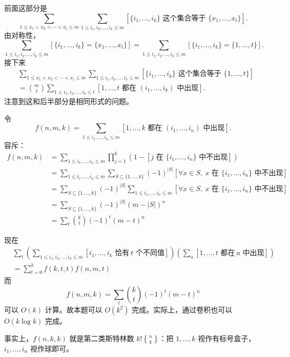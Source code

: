 \begin{frame}
    前面这部分是
    $$
    \sum_{1\le x_1<x_2<\cdots<x_t\le m}\sum_{1\le i_1,i_2,\ldots,i_k\le m}[\{i_1,\ldots,i_k\}\text{ 这个集合等于 }\{x_1,\ldots,x_t\}].
    $$
    由对称性，
    $$
    \sum_{1\le i_1,i_2,\ldots,i_k\le m}[\{i_1,\ldots,i_k\}=\{x_1,\ldots,x_t\}]=\sum_{1\le i_1,i_2,\ldots,i_k\le m}[\{i_1,\ldots,i_k\}=\{1,\ldots,t\}].
    $$
    接下来
    $$
    \begin{aligned}
    &\sum_{1\le x_1<x_2<\cdots<x_t\le m}\sum_{1\le i_1,i_2,\ldots,i_k\le m}[\{i_1,\ldots,i_k\}\text{ 这个集合等于 }\{1,\ldots,t\}]\\
    &=\binom{m}{t}\sum_{1\le i_1,i_2,\ldots,i_k\le t}[1,\ldots,t\text{ 都在 }(i_1,\ldots,i_k)\text{ 中出现}].
    \end{aligned}
    $$
    注意到这和后半部分是相同形式的问题。
\end{frame}
\begin{frame}
    令 
    $$
    f(n,m,k)=\sum_{1\le i_1,\ldots,i_n\le m}[1,\ldots,k\text{ 都在 }(i_1,\ldots,i_n)\text{ 中出现}].
    $$
    容斥：
    $$
    \begin{aligned}
    f(n,m,k)&=\sum_{1\le i_1,\ldots,i_n\le m}\prod_{j=1}^k(1-[j\text{ 在 }\{i_1,\ldots,i_n\}\text{ 中不出现}])\\
    &=\sum_{1\le i_1,\ldots,i_n\le m}\sum_{S\subseteq \{1,\ldots,k\}}(-1)^{|S|}[\forall x\in S,\ x\text{ 在 }\{i_1,\ldots,i_n\}\text{ 中不出现}]\\
    &=\sum_{S\subseteq \{1,\ldots,k\}}(-1)^{|S|}\sum_{1\le i_1,\ldots,i_n\le m}[\forall x\in S,\ x\text{ 在 }\{i_1,\ldots,i_n\}\text{ 中不出现}]\\
    &=\sum_{S\subseteq \{1,\ldots,k\}}(-1)^{|S|}(m-|S|)^n\\
    &=\sum_t\binom{k}{t}(-1)^{t}(m-t)^n
    \end{aligned}
    $$
\end{frame}
\begin{frame}
    现在
    $$
    \begin{aligned}
        &\sum_t\left(\sum_{1\le i_1,i_2,\ldots,i_k\le m}[i_1,\ldots,i_k\text{ 恰有}\ t\text{ 个不同值}]\right)\left(\sum_a[1,\ldots,t\text{ 都在}\ a\text{ 中出现}]\right)\\
        &=\sum_{t=0}^k f(k,t,t)f(n,m,t)
    \end{aligned}
    $$
    而
    $$
    f(n,m,k)=\sum_t\binom{k}{t}(-1)^t(m-t)^n
    $$
    可以 $O(k)$ 计算。故本题可以 $O(k^2)$ 完成。实际上，通过卷积也可以 $O(k\log k)$ 完成。
    
    事实上，$f(n,k,k)$ 就是第二类斯特林数 $k! {n \brace k}$：把 $1,\ldots,k$ 视作有标号盒子，$i_1,\ldots,i_n$ 视作球即可。
\end{frame}
